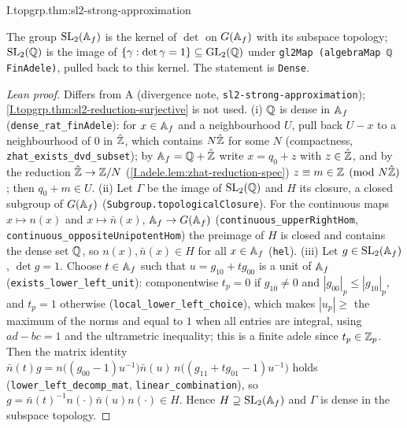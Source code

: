\begin{theorem}
\end{theorem}
\begin{tfformal}{I.topgrp.thm:sl2-strong-approximation}
\begin{tffidelity}
The group $\mathrm{SL}_2(\mathbb{A}_f)$ is the kernel of $\det$ on $G(\mathbb{A}_f)$ with its subspace topology; $\mathrm{SL}_2(\mathbb{Q})$ is the image of $\{\gamma:\det\gamma=1\}\subseteq\mathrm{GL}_2(\mathbb{Q})$ under \texttt{gl2Map (algebraMap ℚ FinAdele)}, pulled back to this kernel. The statement is \texttt{Dense}.
\end{tffidelity}
\end{tfformal}
\begin{proof}[Lean proof]
Differs from A (divergence note, \texttt{sl2-strong-approximation}); \cref{I.topgrp.thm:sl2-reduction-surjective} is not used. (i) $\mathbb{Q}$ is dense in $\mathbb{A}_f$ (\texttt{dense\_rat\_finAdele}): for $x\in\mathbb{A}_f$ and a neighbourhood $U$, pull back $U-x$ to a neighbourhood of $0$ in $\hat{\mathbb{Z}}$, which contains $N\hat{\mathbb{Z}}$ for some $N$ (compactness, \texttt{zhat\_exists\_dvd\_subset}); by $\mathbb{A}_f=\mathbb{Q}+\hat{\mathbb{Z}}$ write $x=q_0+z$ with $z\in\hat{\mathbb{Z}}$, and by the reduction $\hat{\mathbb{Z}}\to\mathbb{Z}/N$ (\cref{I.adele.lem:zhat-reduction-spec}) $z\equiv m\in\mathbb{Z}\pmod{N\hat{\mathbb{Z}}}$; then $q_0+m\in U$. (ii) Let $\Gamma$ be the image of $\mathrm{SL}_2(\mathbb{Q})$ and $H$ its closure, a closed subgroup of $G(\mathbb{A}_f)$ (\texttt{Subgroup.topologicalClosure}). For the continuous maps $x\mapsto n(x)$ and $x\mapsto\bar n(x)$, $\mathbb{A}_f\to G(\mathbb{A}_f)$ (\texttt{continuous\_upperRightHom}, \texttt{continuous\_oppositeUnipotentHom}) the preimage of $H$ is closed and contains the dense set $\mathbb{Q}$, so $n(x),\bar n(x)\in H$ for all $x\in\mathbb{A}_f$ (\texttt{hel}). (iii) Let $g\in\mathrm{SL}_2(\mathbb{A}_f)$, $\det g=1$. Choose $t\in\mathbb{A}_f$ such that $u=g_{10}+tg_{00}$ is a unit of $\mathbb{A}_f$ (\texttt{exists\_lower\_left\_unit}): componentwise $t_p=0$ if $g_{10}\ne0$ and $|g_{00}|_p\le|g_{10}|_p$, and $t_p=1$ otherwise (\texttt{local\_lower\_left\_choice}), which makes $|u_p|\ge$ the maximum of the norms and equal to $1$ when all entries are integral, using $ad-bc=1$ and the ultrametric inequality; this is a finite adele since $t_p\in\mathbb{Z}_p$. Then the matrix identity $\bar n(t)g=n\bigl((g_{00}-1)u^{-1}\bigr)\bar n(u)\,n\bigl((g_{11}+tg_{01}-1)u^{-1}\bigr)$ holds (\texttt{lower\_left\_decomp\_mat}, \texttt{linear\_combination}), so $g=\bar n(t)^{-1}n(\cdot)\bar n(u)n(\cdot)\in H$. Hence $H\supseteq\mathrm{SL}_2(\mathbb{A}_f)$ and $\Gamma$ is dense in the subspace topology.
\end{proof}

